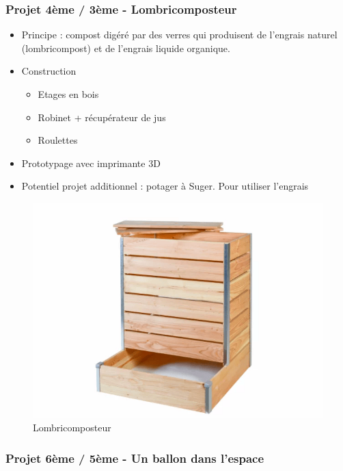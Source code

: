 \documentclass[a4paper,12pt]{article}
\begin{document}
\subsubsection*{Projet 4ème / 3ème - Lombricomposteur}

\begin{itemize}[noitemsep]
  \item Principe : compost digéré par des verres qui produisent de l'engrais naturel (lombricompost) et de l'engrais liquide organique. 
  \item Construction
  \begin{itemize}[noitemsep]
    \item Etages en bois 
    \item Robinet + récupérateur de jus
    \item Roulettes
  \end{itemize}
  \item Prototypage avec imprimante 3D
  \item Potentiel projet additionnel : potager à Suger. Pour utiliser l'engrais
\end{itemize}


\begin{figure}[H]
  \centering
  \includegraphics[width=0.5\linewidth]{lombri_png.png}
  \caption{\label{} Lombricomposteur}
\end{figure}

\subsubsection*{Projet 6ème / 5ème - Un ballon dans l'espace}
\end{document}
